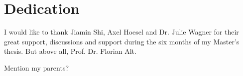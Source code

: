 
\section*{Dedication}


I would like to thank Jiamin Shi, Axel Hoesel and Dr. Julie Wagner for their great support, discussions and support during the six months of my Master's thesis. But above all, Prof. Dr. Florian Alt.

Mention my parents?
